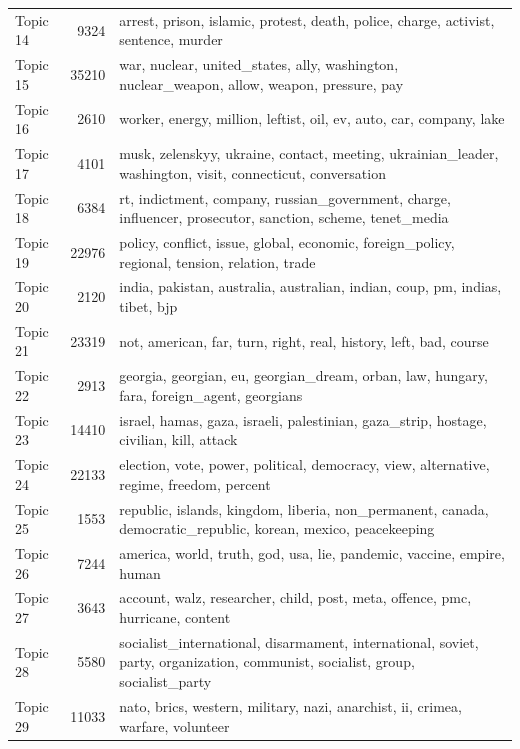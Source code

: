 \begin{table}
\begin{tabular}{lrp{8cm}}
Topic 14 & 9324 & arrest, prison, islamic, protest, death, police, charge, activist, sentence, murder \\
Topic 15 & 35210 & war, nuclear, united\_states, ally, washington, nuclear\_weapon, allow, weapon, pressure, pay \\
Topic 16 & 2610 & worker, energy, million, leftist, oil, ev, auto, car, company, lake \\
Topic 17 & 4101 & musk, zelenskyy, ukraine, contact, meeting, ukrainian\_leader, washington, visit, connecticut, conversation \\
Topic 18 & 6384 & rt, indictment, company, russian\_government, charge, influencer, prosecutor, sanction, scheme, tenet\_media \\
Topic 19 & 22976 & policy, conflict, issue, global, economic, foreign\_policy, regional, tension, relation, trade \\
Topic 20 & 2120 & india, pakistan, australia, australian, indian, coup, pm, indias, tibet, bjp \\
Topic 21 & 23319 & not, american, far, turn, right, real, history, left, bad, course \\
Topic 22 & 2913 & georgia, georgian, eu, georgian\_dream, orban, law, hungary, fara, foreign\_agent, georgians \\
Topic 23 & 14410 & israel, hamas, gaza, israeli, palestinian, gaza\_strip, hostage, civilian, kill, attack \\
Topic 24 & 22133 & election, vote, power, political, democracy, view, alternative, regime, freedom, percent \\
Topic 25 & 1553 & republic, islands, kingdom, liberia, non\_permanent, canada, democratic\_republic, korean, mexico, peacekeeping \\
Topic 26 & 7244 & america, world, truth, god, usa, lie, pandemic, vaccine, empire, human \\
Topic 27 & 3643 & account, walz, researcher, child, post, meta, offence, pmc, hurricane, content \\
Topic 28 & 5580 & socialist\_international, disarmament, international, soviet, party, organization, communist, socialist, group, socialist\_party \\
Topic 29 & 11033 & nato, brics, western, military, nazi, anarchist, ii, crimea, warfare, volunteer \\
\bottomrule
\end{tabular}
\end{table}
